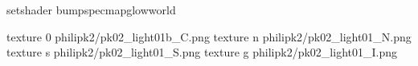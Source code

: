 setshader bumpspecmapglowworld

texture 0 philipk2/pk02_light01b_C.png
texture n philipk2/pk02_light01_N.png
texture s philipk2/pk02_light01_S.png
texture g philipk2/pk02_light01_I.png

